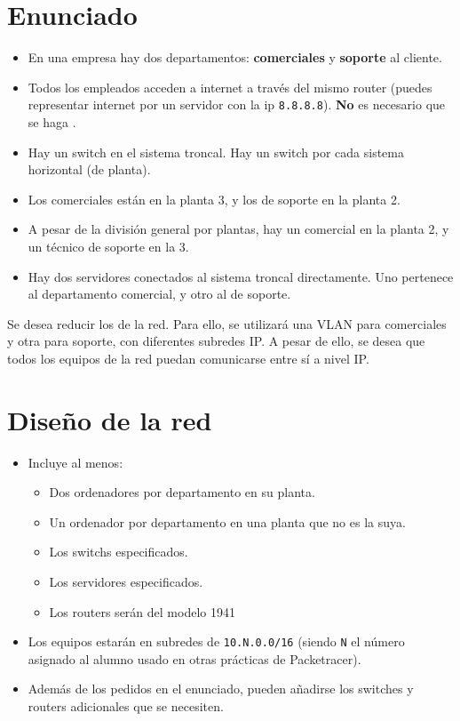 \section{Enunciado}
\begin{itemize}
\item En una empresa hay dos departamentos: \textbf{comerciales} y \textbf{soporte} al cliente.
\item Todos los empleados acceden a internet a través del mismo router (puedes representar internet por un servidor con la ip \texttt{8.8.8.8}). \textbf{No} es necesario que se haga .
\item Hay un switch en el sistema troncal. Hay un switch por cada sistema horizontal (de planta).
\item Los comerciales están en la planta 3, y los de soporte en la planta 2.
\item A pesar de la división general por plantas, hay un comercial en la planta 2, y un técnico de soporte en la 3.
\item Hay dos servidores conectados al sistema troncal directamente. Uno pertenece al departamento comercial, y otro al de soporte.
\end{itemize}
Se desea reducir los  de la red. Para ello, se utilizará una VLAN para comerciales y otra para soporte, con diferentes subredes IP.
A pesar de ello, se desea que todos los equipos de la red puedan comunicarse entre sí a nivel IP.
\section{Diseño de la red}
\begin{itemize}
\item Incluye al menos:
  \begin{itemize}
  \item Dos ordenadores por departamento en su planta.
  \item Un ordenador por departamento en una planta que no es la suya.
  \item Los switchs especificados.
  \item Los servidores especificados.
  \item Los routers serán del modelo 1941  
  \end{itemize}
\item Los equipos estarán en subredes de \texttt{10.N.0.0/16} (siendo \texttt{N} el número asignado al alumno usado en otras prácticas de Packetracer).
\item Además de los pedidos en el enunciado, pueden añadirse los switches y routers adicionales que se necesiten.  
\end{itemize}

